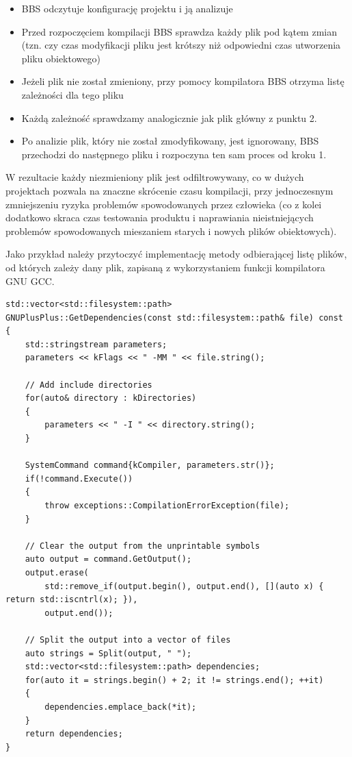 \begin{itemize}
    \item BBS odczytuje konfigurację projektu i ją analizuje
    \item Przed rozpoczęciem kompilacji BBS sprawdza każdy plik pod kątem zmian (tzn. czy czas modyfikacji pliku jest krótszy niż odpowiedni czas utworzenia pliku obiektowego)
    \item Jeżeli plik nie został zmieniony, przy pomocy kompilatora BBS otrzyma listę zależności dla tego pliku
    \item Każdą zależność sprawdzamy analogicznie jak plik główny z punktu 2.
    \item Po analizie plik, który nie został zmodyfikowany, jest ignorowany, BBS przechodzi do następnego pliku i rozpoczyna ten sam proces od kroku 1.
\end{itemize}

W rezultacie każdy niezmieniony plik jest odfiltrowywany, co w dużych projektach pozwala na znaczne skrócenie czasu kompilacji, przy jednoczesnym zmniejszeniu ryzyka problemów spowodowanych przez człowieka (co z kolei dodatkowo skraca czas testowania produktu i naprawiania nieistniejących problemów spowodowanych mieszaniem starych i nowych plików obiektowych).

Jako przykład należy przytoczyć implementację metody odbierającej listę plików, od których zależy dany plik, zapisaną z wykorzystaniem funkcji kompilatora GNU GCC.

\begin{lstlisting}[label=list:dependencies,caption=Implementacja metody GNUPlusPlus::GetDependencies(),basicstyle=\footnotesize\ttfamily]
std::vector<std::filesystem::path>
GNUPlusPlus::GetDependencies(const std::filesystem::path& file) const
{
	std::stringstream parameters;
	parameters << kFlags << " -MM " << file.string();

	// Add include directories
	for(auto& directory : kDirectories)
	{
		parameters << " -I " << directory.string();
	}

	SystemCommand command{kCompiler, parameters.str()};
	if(!command.Execute())
	{
		throw exceptions::CompilationErrorException(file);
	}

	// Clear the output from the unprintable symbols
	auto output = command.GetOutput();
	output.erase(
		std::remove_if(output.begin(), output.end(), [](auto x) { return std::iscntrl(x); }),
		output.end());

	// Split the output into a vector of files
	auto strings = Split(output, " ");
	std::vector<std::filesystem::path> dependencies;
	for(auto it = strings.begin() + 2; it != strings.end(); ++it)
	{
		dependencies.emplace_back(*it);
	}
	return dependencies;
}
\end{lstlisting}

